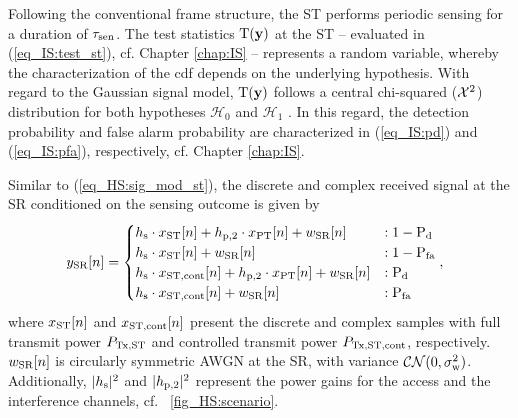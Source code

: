 Following the conventional frame structure, the ST performs periodic sensing for a duration of $\tau_{\text{sen}}$. The test statistics $\operatorname*{\text{T}(\textbf{y})}$ at the ST -- evaluated in (\ref{eq_IS:test_st}), cf. Chapter \ref{chap:IS} -- %
represents a random variable, whereby the characterization of the cdf depends on the underlying hypothesis. With regard to the Gaussian signal model, $\operatorname*{\text{T}(\textbf{y})}$ follows a central chi-squared ($\cchi2$) distribution for both hypotheses $\mathcal H_0$ and $\mathcal H_1$ \cite{Kay}. In this regard, the detection probability and false alarm probability are characterized in (\ref{eq_IS:pd}) and (\ref{eq_IS:pfa}), respectively, cf. Chapter \ref{chap:IS}. 

Similar to (\ref{eq_HS:sig_mod_st}), the discrete and complex received signal at the SR conditioned on the sensing outcome is given by 
\begin{equation}
\hspace{-2.3mm}
\ys[n] = 
\begin{cases}
\hs \cdot \xsfull[n] + \hptw \cdot \xp[n] + \wsr[n] &: 1 - \pd \\
\hs \cdot \xsfull[n] + \wsr[n] &: 1 - \pfa \\
\hs \cdot \xscont[n] + \hptw \cdot \xp[n] + \wsr[n] &: \pd \\
\hs \cdot \xscont[n] + \wsr[n] &: \pfa 
\end{cases},
\label{eq_HS:sig_mod_sr}
\end{equation}
where $x_{\text{ST}}[n]$ and $x_{\text{ST,cont}}[n]$ present the discrete and complex samples with full transmit power $P_{\text{Tx,ST}}$ and controlled transmit power $P_{\text{Tx,ST,cont}}$, respectively. $w_{\text{SR}}[n]$ is circularly symmetric AWGN at the SR, with variance $\mathcal{CN}(0,\sigma^2_{\text{w}})$. Additionally, $|h_{\text{s}}|^2$ and $|h_{\text{p,2}}|^2$ represent the power gains for the access and the interference channels, cf. \figurename~\ref{fig_HS:scenario}. 


